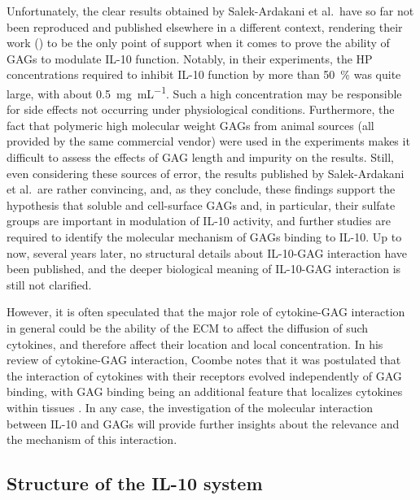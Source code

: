 Unfortunately, the clear results obtained by Salek-Ardakani et al.\ have so far
not been reproduced and published elsewhere in a different context, rendering
their work (\cite{salek_ardakani_2000}) to be the only point of support when it
comes to prove the ability of GAGs to modulate IL-10 function. Notably, in their
experiments, the HP concentrations required to inhibit IL-10 function by more
than \SI{50}{\percent} was quite large, with about
\SI{0.5}{\milli\gram\per\milli\liter}. Such a high concentration may be
responsible for side effects not occurring under physiological conditions.
Furthermore, the fact that polymeric high molecular weight GAGs from animal
sources (all provided by the same commercial vendor) were used in the
experiments makes it difficult to assess the effects of GAG length and impurity
on the results. Still, even considering these sources of error, the results
published by Salek-Ardakani et al.\ are rather convincing, and, as they
conclude, these findings support the hypothesis that soluble and cell-surface
GAGs and, in particular, their sulfate groups are important in modulation of
IL-10 activity, and further studies are required to identify the molecular
mechanism of GAGs binding to IL-10. Up to now, several years later, no
structural details about IL-10-GAG interaction have been published, and the
deeper biological meaning of IL-10-GAG interaction is still not clarified.

However, it is often speculated that the major role of cytokine-GAG interaction
in general could be the ability of the ECM to affect the diffusion of such
cytokines, and therefore affect their location and local concentration. In his
review of cytokine-GAG interaction, Coombe notes that it was postulated that the
interaction of cytokines with their receptors evolved independently of GAG
binding, with GAG binding being an additional feature that localizes cytokines
within tissues \cite{coombe_cytokine_gag_2008}. In any case, the investigation
of the molecular interaction between IL-10 and GAGs will provide further
insights about the relevance and the mechanism of this interaction.


\subsection{Structure of the IL-10 system}
\label{background:structureil10system}

